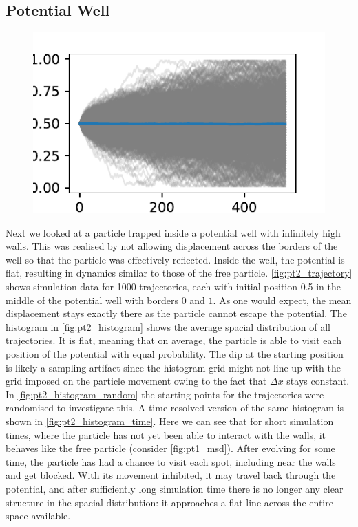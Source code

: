 \documentclass[
    parskip=half, 
    twoside=false,
    twocolumn=true,
    fontsize=11pt,
]{scrarticle}
\begin{document}
\subsection{Potential Well}
\begin{figure}
\label{fig:pt2_trajectory}
 \includegraphics{figures/02 time evolution.pdf}
\end{figure}

Next we looked at a particle trapped inside a potential well with infinitely high walls. This was realised by not allowing displacement across the borders of the well so that the particle was effectively reflected. Inside the well, the potential is flat, resulting in dynamics similar to those of the free particle. \autoref{fig:pt2_trajectory} shows simulation data for \SI{1000}{} trajectories, each with initial position \SI{0.5}{} in the middle of the potential well with borders $0$ and $1$. As one would expect, the mean displacement stays exactly there as the particle cannot escape the potential. The histogram in \autoref{fig:pt2_histogram} shows the average spacial distribution of all trajectories. It is flat, meaning that on average, the particle is able to visit each position of the potential with equal probability. The dip at the starting position is likely a sampling artifact since the histogram grid might not line up with the grid imposed on the particle movement owing to the fact that $\Delta x$ stays constant. In \autoref{fig:pt2_histogram_random} the starting points for the trajectories were randomised to investigate this. A time-resolved version of the same histogram is shown in \autoref{fig:pt2_histogram_time}. Here we can see that for short simulation times, where the particle has not yet been able to interact with the walls, it behaves like the free particle (consider \autoref{fig:pt1_msd}). After evolving for some time, the particle has had a chance to visit each spot, including near the walls and get blocked. With its movement inhibited, it may travel back through the potential, and after sufficiently long simulation time there is no longer any clear structure in the spacial distribution: it approaches a flat line across the entire space available.
\end{document}
